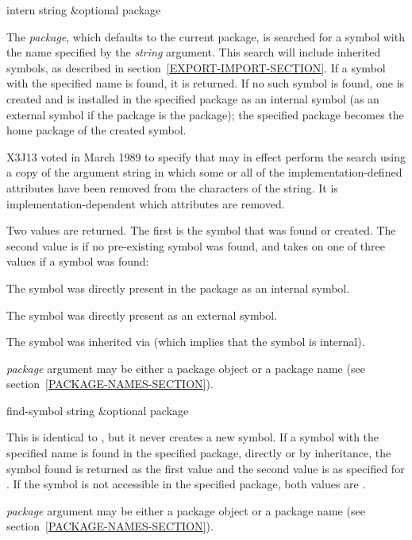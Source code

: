 \begin{defun}[Function]
intern string &optional package

The \emph{package}, which defaults to the current package, is
searched for a symbol with the name specified by the \emph{string}
argument.  This search will include inherited symbols, as described
in section~\ref{EXPORT-IMPORT-SECTION}.
If a symbol with the specified name is found, it is returned.
If no such symbol is found, one is created and is installed in the
specified package as an internal symbol (as an external symbol
if the package is the  package); the specified package becomes the
home package of the created symbol.

\begin{newer}
X3J13 voted in March 1989 
to specify that  may in effect perform the
search using a copy of the argument string in which
some or all of the implementation-defined
attributes have been removed from the characters of the string.
It is implementation-dependent which attributes are removed.
\end{newer}

Two values are returned.  The first is the symbol that was found or
created.  The second value is {\false} if no pre-existing symbol was found,
and takes on one of three values if a symbol was found:
\begin{indentdesc}{6pc}
\item[\cd{:internal}]
The symbol was directly present in the package as an internal symbol.

\item[\cd{:external}]
The symbol was directly present as an external symbol.

\item[\cd{:inherited}]
The symbol was inherited via  (which
implies that the symbol is internal).
\end{indentdesc}

\emph{package} argument may be either a package object
or a package name (see section~\ref{PACKAGE-NAMES-SECTION}).
\end{defun}

\begin{defun}[Function]
find-symbol string &optional package

This is identical to , but it never creates a new symbol.  If
a symbol with the specified name is found in the specified package,
directly or by inheritance, the symbol found is returned as the first
value and the second value is as specified for .  If the
symbol is not accessible in the specified package, both values are
{\false}.

\emph{package} argument may be either a package object
or a package name (see section~\ref{PACKAGE-NAMES-SECTION}).
\end{defun}

